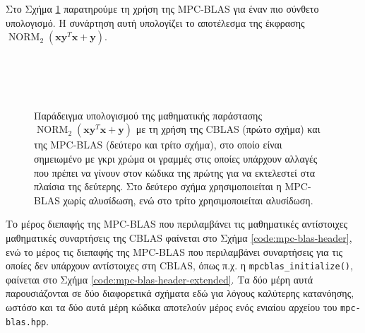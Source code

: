 Στο Σχήμα \ref{code:mpc-blas-differences-2} παρατηρούμε τη χρήση της MPC-BLAS για έναν πιο σύνθετο υπολογισμό. Η συνάρτηση αυτή υπολογίζει το αποτέλεσμα της έκφρασης $\operatorname{NORM}_2(\textbf{x}\textbf{y}^{T}\textbf{x} + \textbf{y})$.

\begin{figure}[htbp]
    \begin{minipage}[b]{0.45\textwidth}
        \inputminted[fontsize=\scriptsize,frame=single, linenos]{cpp}{./01_body/code/cblas-differences-2.cpp}
    \end{minipage} \hfill
    \begin{minipage}[b]{0.45\textwidth}
        \inputminted[fontsize=\scriptsize,frame=single, linenos, highlightlines={1,3,4,5,7,10,12},highlightcolor=lightgray]{cpp}{./01_body/code/mpc-blas-differences-2.cpp}
    \end{minipage}\\[1ex]
    \begin{center}
    \begin{minipage}{0.45\textwidth}
        \inputminted[fontsize=\scriptsize,frame=single, linenos, highlightlines={1,3,4,5,7,9,11},highlightcolor=lightgray]{cpp}{./01_body/code/mpc-blas-differences-3.cpp}
    \end{minipage}
    \end{center}
    \caption[Παράδειγμα υπολογισμού της μαθηματικής παράστασης $\operatorname{NORM}_2(\textbf{x}\textbf{y}^{T}\textbf{x} + \textbf{y})$ με τη χρήση της CBLAS και της MPC-BLAS]{Παράδειγμα υπολογισμού της μαθηματικής παράστασης $\operatorname{NORM}_2(\textbf{x}\textbf{y}^{T}\textbf{x} + \textbf{y})$ με τη χρήση της CBLAS (πρώτο σχήμα) και της MPC-BLAS (δεύτερο και τρίτο σχήμα), στο οποίο είναι σημειωμένο με γκρι χρώμα οι γραμμές στις οποίες υπάρχουν αλλαγές που πρέπει να γίνουν στον κώδικα της πρώτης για να εκτελεστεί στα πλαίσια της δεύτερης. Στο δεύτερο σχήμα χρησιμοποιείται η MPC-BLAS χωρίς αλυσίδωση, ενώ στο τρίτο χρησιμοποιείται αλυσίδωση.}
    \label{code:mpc-blas-differences-2}
\end{figure}

Το μέρος διεπαφής της MPC-BLAS που περιλαμβάνει τις μαθηματικές αντίστοιχες μαθηματικές συναρτήσεις της CBLAS φαίνεται στο Σχήμα \ref{code:mpc-blas-header}, ενώ το μέρος τις διεπαφής της MPC-BLAS που περιλαμβάνει συναρτήσεις για τις οποίες δεν υπάρχουν αντίστοιχες στη CBLAS, όπως π.χ. η \texttt{mpcblas_initialize()}, φαίνεται στο Σχήμα \ref{code:mpc-blas-header-extended}. Τα δύο μέρη αυτά παρουσιάζονται σε δύο διαφορετικά σχήματα εδώ για λόγους καλύτερης κατανόησης, ωστόσο και τα δύο αυτά μέρη κώδικα αποτελούν μέρος ενός ενιαίου αρχείου του \texttt{mpc-blas.hpp}.


